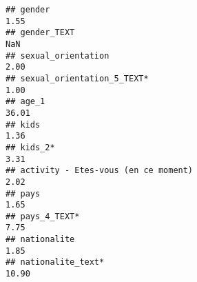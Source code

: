 \documentclass[
]{article}
\begin{document}
\begin{verbatim}
## gender                                                                                                                                                                                                                        1.55
## gender_TEXT                                                                                                                                                                                                                    NaN
## sexual_orientation                                                                                                                                                                                                            2.00
## sexual_orientation_5_TEXT*                                                                                                                                                                                                    1.00
## age_1                                                                                                                                                                                                                        36.01
## kids                                                                                                                                                                                                                          1.36
## kids_2*                                                                                                                                                                                                                       3.31
## activity - Etes-vous (en ce moment)                                                                                                                                                                                           2.02
## pays                                                                                                                                                                                                                          1.65
## pays_4_TEXT*                                                                                                                                                                                                                  7.75
## nationalite                                                                                                                                                                                                                   1.85
## nationalite_text*                                                                                                                                                                                                            10.90

\end{verbatim}
\end{document}
